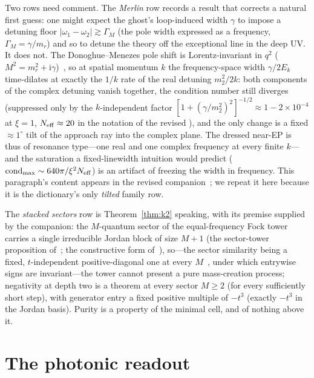 ﻿\documentclass[11pt]{article}
\newcommand{\ii}{\mathrm{i}}
\theoremstyle{remark}
\begin{document}
Two rows need comment. The \emph{Merlin} row records a result that
corrects a natural first guess: one might expect the ghost's
loop-induced width $\gamma$ to impose a detuning floor
$|\omega_1-\omega_2|\gtrsim\Gamma_M$ (the pole width expressed as a
frequency, $\Gamma_M=\gamma/m_r$) and so to detune the theory
off the exceptional line in the deep UV. It does not. The
Donoghue--Menezes pole shift is Lorentz-invariant in $q^2$
($M^2=m_r^2+\ii\gamma$)~\cite{DonoghueMenezes}, so at spatial
momentum $k$ the frequency-space width $\gamma/2E_k$ time-dilates
at exactly the $1/k$ rate of the real detuning $m_2^2/2k$: both
components of the complex detuning vanish together, the condition
number still diverges (suppressed only by the $k$-independent
factor $[1+(\gamma/m_2^2)^2]^{-1/2}\approx1-2\times10^{-4}$ at
$\xi=1$, $N_{\rm eff}\approx20$ in the notation of the revised
\cite{choosing}), and the only change is a fixed
$\approx1^\circ$ tilt of the approach ray into the complex plane.
The dressed near-EP is thus of resonance type---one real and one
complex frequency at every finite $k$---and the saturation a
fixed-linewidth intuition would predict
($\mathrm{cond}_{\max}\sim640\pi/\xi^2N_{\rm eff}$) is an artifact
of freezing the width in frequency. This paragraph's content
appears in the revised companion~\cite{choosing}; we repeat it
here because it is the dictionary's only \emph{tilted} family row.

The \emph{stacked sectors} row is Theorem~\ref{thm:k2} speaking,
with its premise supplied by the companion: the $M$-quantum sector
of the equal-frequency Fock tower carries a single irreducible
Jordan block of size $M{+}1$ (the sector-tower proposition
of~\cite{choosing}; the constructive form of~\cite{Smilga2014}),
so---the sector similarity being a fixed, $t$-independent positive-diagonal one
at every $M$~\cite{choosing}, under which entrywise signs are invariant---the
tower cannot present a pure
mass-creation process; negativity at depth two is a theorem at every sector
$M\ge2$ (for every
sufficiently short step), with generator entry a fixed positive multiple of
$-t^3$ (exactly $-t^3$ in the Jordan basis). Purity is a property of the
minimal cell, and of nothing above it.

\section{The photonic readout}
\label{sec:photonic}
\end{document}
